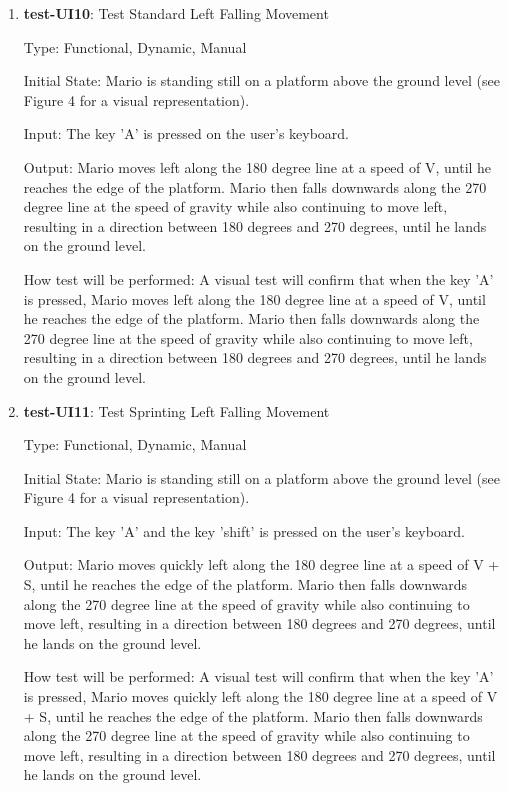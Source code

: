 \documentclass[12pt, titlepage]{article}
\begin{document}
\begin{enumerate}
\item{\textbf{test-UI10}: Test Standard Left Falling Movement\\}

Type: Functional, Dynamic, Manual

Initial State: Mario is standing still on a platform above the ground level (see Figure 4 for a visual representation).

Input: The key 'A' is pressed on the user's keyboard.

Output: Mario moves left along the 180 degree line at a speed of V, until he reaches the edge of the platform. Mario then falls downwards along the 270 degree line at the speed of gravity while also continuing to move left, resulting in a direction between 180 degrees and 270 degrees, until he lands on the ground level.

How test will be performed: A visual test will confirm that when the key 'A' is pressed, Mario moves left along the 180 degree line at a speed of V, until he reaches the edge of the platform. Mario then falls downwards along the 270 degree line at the speed of gravity while also continuing to move left, resulting in a direction between 180 degrees and 270 degrees, until he lands on the ground level.

\item{\textbf{test-UI11}: Test Sprinting Left Falling Movement\\}

Type: Functional, Dynamic, Manual

Initial State: Mario is standing still on a platform above the ground level (see Figure 4 for a visual representation).

Input: The key 'A' and the key 'shift' is pressed on the user's keyboard.

Output: Mario moves quickly left along the 180 degree line at a speed of V + S, until he reaches the edge of the platform. Mario then falls downwards along the 270 degree line at the speed of gravity while also continuing to move left, resulting in a direction between 180 degrees and 270 degrees, until he lands on the ground level.

How test will be performed: A visual test will confirm that when the key 'A' is pressed, Mario moves quickly left along the 180 degree line at a speed of V + S, until he reaches the edge of the platform. Mario then falls downwards along the 270 degree line at the speed of gravity while also continuing to move left, resulting in a direction between 180 degrees and 270 degrees, until he lands on the ground level.


\end{enumerate}
\end{document}
